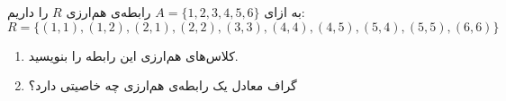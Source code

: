 \EXERCISE
به ازای
$A = \{1, 2, 3, 4, 5, 6\}$
رابطه‌ی هم‌ارزی
$R$
را داریم:
$$R = \{(1, 1), (1, 2), (2, 1), (2, 2), (3, 3), (4, 4), (4, 5), (5, 4), (5, 5), (6, 6)\}$$
\begin{enumerate}
\item
کلاس‌های هم‌ارزی این رابطه را بنویسید.
\item
گراف معادل یک رابطه‌ی هم‌ارزی چه خاصیتی دارد؟
\end{enumerate}
